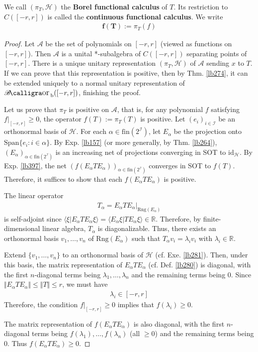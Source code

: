 \documentclass[12pt,b5paper,notitlepage]{article}
\theoremstyle{definition}
\theoremstyle{plain}
\DeclareMathOperator{\Borb}{{\mathscr{B}\text{\kern -2pt {\calligra\large or}}\,}_{\mathrm b}}
\newcommand{\id}{\mathrm{id}}
\newcommand{\Span}{\mathrm{Span}}
\newcommand{\bk}[1]{\langle {#1}\rangle}
\newcommand{\scr}{\mathscr}
\newcommand{\Rbb}{\mathbb R}
\newcommand{\Rng}{\mathrm{Rng}}
\newcommand{\fin}{\mathrm{fin}}
\newcommand{\MH}{\mathcal H}
\numberwithin{equation}{section}
\begin{document}
We call $(\pi_T,\MH)$ the \textbf{Borel functional calculus}  of $T$. Its restriction to $C([-r,r])$ is called the \textbf{continuous functional calculus}.  We write 
\begin{align*}
\pmb{f(T)}:=\pi_T(f)
\end{align*}


\begin{proof}
Let $\scr A$ be the set of polynomials on $[-r,r]$ (viewed as functions on $[-r,r]$). Then $\scr A$ is a unital *-subalgebra of $C([-r,r])$ separating points of $[-r,r]$. There is a unique unitary representation $(\pi_T,\MH)$ of $\scr A$ sending $x$ to $T$. If we can prove that this representation is positive, then by Thm. \ref{lb274}, it can be extended uniquely to a normal unitary representation of $\Borb([-r,r])$, finishing the proof.

Let us prove that $\pi_T$ is positive on $\scr A$, that is, for any polynomial $f$ satisfying $f|_{[-r,r]}\geq0$, the operator $f(T):=\pi_T(T)$ is positive. Let $(e_i)_{i\in\scr I}$ be an orthonormal basis of $\MH$. For each $\alpha\in\fin(2^{\scr I})$, let $E_\alpha$ be the projection onto $\Span\{e_i:i\in\alpha\}$. By Exp. \ref{lb157} (or more generally, by Thm. \ref{lb264}), $(E_\alpha)_{\alpha\in\fin(2^{\scr I})}$ is an increasing net of projections converging in SOT to $\id_\MH$. By Exp. \ref{lb397}, the net $(f(E_\alpha TE_\alpha))_{\alpha\in\fin(2^{\scr I})}$ converges in SOT to $f(T)$. Therefore, it suffices to show that each $f(E_\alpha TE_\alpha)$ is positive.


The linear operator
\begin{align*}
T_\alpha=E_\alpha TE_\alpha\big|_{\Rng(E_\alpha)}
\end{align*}
is self-adjoint since $\bk{\xi|E_\alpha TE_\alpha\xi}=\bk{E_\alpha\xi|TE_\alpha\xi}\in\Rbb$. Therefore, by finite-dimensional linear algebra, $T_\alpha$ is diagonalizable. Thus, there exists an orthonormal basis $v_1,\dots,v_n$ of $\Rng(E_\alpha)$ such that $T_\alpha v_i=\lambda_iv_i$ with $\lambda_i\in\Rbb$. 

Extend $\{v_1,\dots,v_n\}$ to an orthonormal basis of $\MH$ (cf. Exe. \ref{lb281}). Then, under this basis, the matrix representation of $E_\alpha TE_\alpha$ (cf. Def. \ref{lb280}) is diagonal, with the first $n$-diagonal terms being $\lambda_1,\dots,\lambda_n$ and the remaining terms being $0$. Since $\Vert E_\alpha TE_\alpha\Vert\leq\Vert T\Vert\leq r$, we must have
\begin{align*}
\lambda_i\in[-r,r]
\end{align*}
Therefore, the condition $f|_{[-r,r]}\geq0$ implies that $f(\lambda_i)\geq0$. 

The matrix representation of $f(E_\alpha TE_\alpha)$ is also diagonal, with the first $n$-diagonal terms being $f(\lambda_1),\dots,f(\lambda_n)$ (all $\geq0$) and the remaining terms being $0$. Thus $f(E_\alpha TE_\alpha)\geq0$.
\end{proof}
\end{document}
